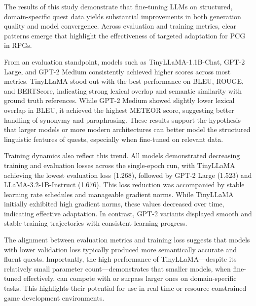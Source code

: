 The results of this study demonstrate that fine-tuning LLMs on structured, domain-specific
quest data yields substantial improvements in both generation quality and model
convergence. Across evaluation and training metrics, clear patterns emerge that highlight
the effectiveness of targeted adaptation for PCG in RPGs.

From an evaluation standpoint, models such as TinyLLaMA-1.1B-Chat, GPT-2 Large,
and GPT-2 Medium consistently achieved higher scores across most metrics. TinyLLaMA
stood out with the best performance on BLEU, ROUGE, and BERTScore, indicating
strong lexical overlap and semantic similarity with ground truth references. While GPT-2
Medium showed slightly lower lexical overlap in BLEU, it achieved the highest METEOR
score, suggesting better handling of synonymy and paraphrasing. These results support
the hypothesis that larger models or more modern architectures can better model the
structured linguistic features of quests, especially when fine-tuned on relevant data.

Training dynamics also reflect this trend. All models demonstrated decreasing training
and evaluation losses across the single-epoch run, with TinyLLaMA achieving the lowest
evaluation loss (1.268), followed by GPT-2 Large (1.523) and LLaMA-3.2-1B-Instruct
(1.676). This loss reduction was accompanied by stable learning rate schedules and manageable
gradient norms. While TinyLLaMA initially exhibited high gradient norms, these
values decreased over time, indicating effective adaptation. In contrast, GPT-2 variants
displayed smooth and stable training trajectories with consistent learning progress.

The alignment between evaluation metrics and training loss suggests that models with
lower validation loss typically produced more semantically accurate and fluent quests.
Importantly, the high performance of TinyLLaMA—despite its relatively small parameter
count—demonstrates that smaller models, when fine-tuned effectively, can compete with
or surpass larger ones on domain-specific tasks. This highlights their potential for use in
real-time or resource-constrained game development environments.

